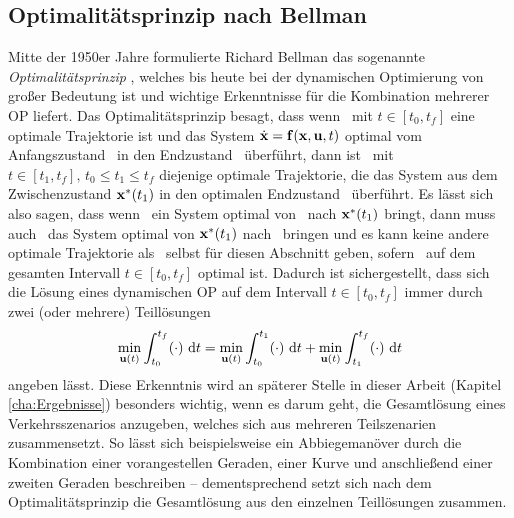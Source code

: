\subsection{Optimalitätsprinzip nach Bellman}\label{subsec:Optimalitätsprinzip}
Mitte der 1950er Jahre formulierte Richard Bellman das sogenannte \textit{Optimalitätsprinzip} \cite{Bellman.1984}, welches bis heute bei der dynamischen Optimierung von großer Bedeutung ist und wichtige Erkenntnisse für die Kombination mehrerer \gls{OP} liefert. Das Optimalitätsprinzip besagt, dass wenn \uoptoft~mit $t\in[t_0, t_f]$ eine optimale Trajektorie ist und das System $\dot{\boldsymbol{\mathrm{x}}} = \boldsymbol{\mathrm{f}}(\boldsymbol{\mathrm{x}},\boldsymbol{\mathrm{u}},t)$ optimal vom Anfangszustand \xoftzero~in den Endzustand \xoptoftf~überführt, dann ist \uoptoft~mit $t\in[t_1, t_f],\, t_0\leq t_1\leq t_f$ diejenige optimale Trajektorie, die das System aus dem Zwischenzustand ${\boldsymbol{\mathrm{x}}}^*(t_1)$ in den optimalen Endzustand \xoptoftf~überführt. Es lässt sich also sagen, dass wenn \uoptoft~ein System optimal von \xoftzero~nach ${\boldsymbol{\mathrm{x}}}^*(t_1)$ bringt, dann muss auch \uoptoft~das System optimal von ${\boldsymbol{\mathrm{x}}}^*(t_1)$ nach \xoptoftf~bringen und es kann keine andere optimale Trajektorie als \uoptoft~selbst für diesen Abschnitt geben, sofern \uoptoft~auf dem gesamten Intervall $t\in[t_0, t_f]$ optimal ist. Dadurch ist sichergestellt, dass sich die Lösung eines dynamischen \gls{OP} auf dem Intervall $t\in[t_0, t_f]$ immer durch zwei (oder mehrere) Teillösungen 
\begin{equation}
	\min_{\boldsymbol{\mathrm{u}}(t)} \int_{t_0}^{t_f}(\cdot)~\textrm{d}{t} = \min_{\boldsymbol{\mathrm{u}}(t)} \int_{t_0}^{t_1}(\cdot)~\textrm{d}{t} + \min_{\boldsymbol{\mathrm{u}}(t)} \int_{t_1}^{t_f}(\cdot)~\textrm{d}{t}
\end{equation}
angeben lässt. Diese Erkenntnis wird an späterer Stelle in dieser Arbeit (Kapitel \ref{cha:Ergebnisse}) besonders wichtig, wenn es darum geht, die Gesamtlösung eines Verkehrsszenarios anzugeben, welches sich aus mehreren Teilszenarien zusammensetzt. So lässt sich beispielsweise ein Abbiegemanöver durch die Kombination einer vorangestellen Geraden, einer Kurve und anschließend einer zweiten Geraden beschreiben -- dementsprechend setzt sich nach dem Optimalitätsprinzip die Gesamtlösung aus den einzelnen Teillösungen zusammen.
